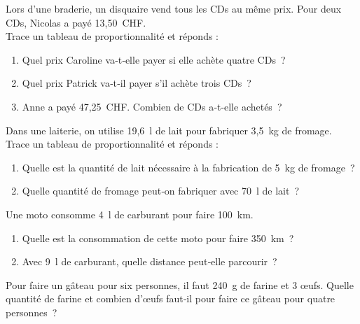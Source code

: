 
\begin{exercice}[À la braderie]
Lors d'une braderie, un disquaire vend tous les CDs au même prix. Pour deux CDs, Nicolas a payé 13,50 CHF. \\[0.5em]
Trace un tableau de proportionnalité et réponds :
\begin{enumerate}
 \item Quel prix Caroline va‑t‑elle payer si elle achète quatre CDs ?
 \item Quel prix Patrick va‑t‑il payer s'il achète trois CDs ?
 \item Anne a payé 47,25 CHF. Combien de CDs a‑t‑elle achetés ?
 \end{enumerate}
\end{exercice}

\newpage

\begin{exercice}[À la laiterie]
Dans une laiterie, on utilise 19,6 l de lait pour fabriquer 3,5 kg de fromage. \\[0.5em]
Trace un tableau de proportionnalité et réponds :
\begin{enumerate}
 \item Quelle est la quantité de lait nécessaire à la fabrication de 5 kg de fromage ?
 \item Quelle quantité de fromage peut‑on fabriquer avec 70 l de lait ?
 \end{enumerate}
\end{exercice}


\begin{exercice}
Une moto consomme 4 l de carburant pour faire 100 km.
\begin{enumerate}
 \item Quelle est la consommation de cette moto pour faire 350 km ?
 \item Avec 9 l de carburant, quelle distance peut‑elle parcourir ?
 \end{enumerate}
\end{exercice}


\begin{exercice}[Recette]
Pour faire un gâteau pour six personnes, il faut 240 g de farine et 3 œufs. Quelle quantité de farine et combien d'œufs faut‑il pour faire ce gâteau pour quatre personnes ?
\end{exercice}


